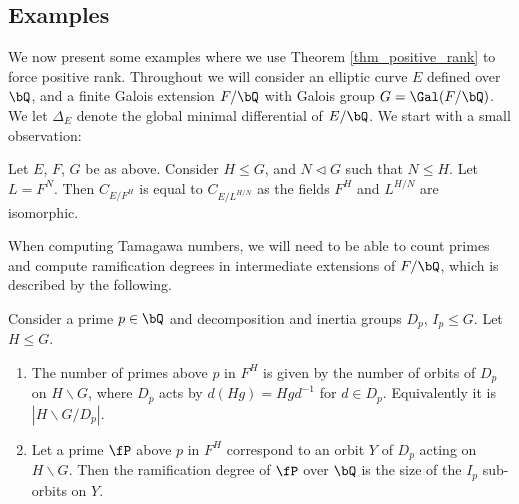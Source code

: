 \subsection{Examples}\label{sec_examples}

We now present some examples where we use Theorem \ref{thm_positive_rank} to force positive rank. Throughout we will consider an elliptic curve $E$ defined over $\bQ$, and a finite Galois extension $F / \bQ$ with Galois group $G = \Gal(F / \bQ)$. We let $\Delta_E$ denote the global minimal differential of $E / \bQ$. 
We start with a small observation:

\begin{rem}
   Let $E$, $F$, $G$ be as above. Consider $H \leq G$, and $N \triangleleft G$ such that $N \leq H$. Let $L = F^N$. Then $C_{E / F^H}$ is equal to $C_{E / L^{H/N}}$ as the fields $F^H$ and $L^{H/ N}$ are isomorphic. 
\end{rem}



When computing Tamagawa numbers, we will need to be able to count primes and compute ramification degrees in intermediate extensions of $F / \bQ$, which is described by the following. 

\begin{exercise}\label{ex-counting}
Consider a prime $p \in \bQ$ and decomposition and inertia groups $D_p$, $I_p \leq G$. Let $H \leq G$. 
\begin{enumerate}
    \setlength\itemsep{0em}
    \item The number of primes above $p$ in $F^H$ is given by the number of orbits of $D_p$ on $H \backslash G$, where $D_p$ acts by $d(Hg) = H g d^{-1}$ for $d \in D_p$. Equivalently it is $|H \backslash G / D_p|$.
    \item Let a prime $\fP$ above $p$ in $F^H$ correspond to an orbit $Y$ of $D_p$ acting on $H \backslash G$. Then the ramification degree of $\fP$ over $\bQ$ is the size of the $I_p$ sub-orbits on $Y$. 
\end{enumerate}
\end{exercise}


